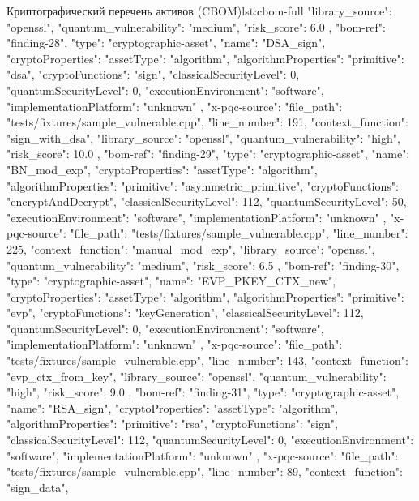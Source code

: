 \documentclass{itmo-vkr}
\begin{document}
\begin{itmolisting}[JSON]{Криптографический перечень активов (CBOM)}{lst:cbom-full}
{{{				"library_source": "openssl",
				"quantum_vulnerability": "medium",
				"risk_score": 6.0
			}
		},
		{
			"bom-ref": "finding-28",
			"type": "cryptographic-asset",
			"name": "DSA_sign",
			"cryptoProperties": {
				"assetType": "algorithm",
				"algorithmProperties": {
					"primitive": "dsa",
					"cryptoFunctions": "sign",
					"classicalSecurityLevel": 0,
					"quantumSecurityLevel": 0,
					"executionEnvironment": "software",
					"implementationPlatform": "unknown"
				}
			},
			"x-pqc-source": {
				"file_path": "tests/fixtures/sample_vulnerable.cpp",
				"line_number": 191,
				"context_function": "sign_with_dsa",
				"library_source": "openssl",
				"quantum_vulnerability": "high",
				"risk_score": 10.0
			}
		},
		{
			"bom-ref": "finding-29",
			"type": "cryptographic-asset",
			"name": "BN_mod_exp",
			"cryptoProperties": {
				"assetType": "algorithm",
				"algorithmProperties": {
					"primitive": "asymmetric_primitive",
					"cryptoFunctions": "encryptAndDecrypt",
					"classicalSecurityLevel": 112,
					"quantumSecurityLevel": 50,
					"executionEnvironment": "software",
					"implementationPlatform": "unknown"
				}
			},
			"x-pqc-source": {
				"file_path": "tests/fixtures/sample_vulnerable.cpp",
				"line_number": 225,
				"context_function": "manual_mod_exp",
				"library_source": "openssl",
				"quantum_vulnerability": "medium",
				"risk_score": 6.5
			}
		},
		{
			"bom-ref": "finding-30",
			"type": "cryptographic-asset",
			"name": "EVP_PKEY_CTX_new",
			"cryptoProperties": {
				"assetType": "algorithm",
				"algorithmProperties": {
					"primitive": "evp",
					"cryptoFunctions": "keyGeneration",
					"classicalSecurityLevel": 112,
					"quantumSecurityLevel": 0,
					"executionEnvironment": "software",
					"implementationPlatform": "unknown"
				}
			},
			"x-pqc-source": {
				"file_path": "tests/fixtures/sample_vulnerable.cpp",
				"line_number": 143,
				"context_function": "evp_ctx_from_key",
				"library_source": "openssl",
				"quantum_vulnerability": "high",
				"risk_score": 9.0
			}
		},
		{
			"bom-ref": "finding-31",
			"type": "cryptographic-asset",
			"name": "RSA_sign",
			"cryptoProperties": {
				"assetType": "algorithm",
				"algorithmProperties": {
					"primitive": "rsa",
					"cryptoFunctions": "sign",
					"classicalSecurityLevel": 112,
					"quantumSecurityLevel": 0,
					"executionEnvironment": "software",
					"implementationPlatform": "unknown"
				}
			},
			"x-pqc-source": {
				"file_path": "tests/fixtures/sample_vulnerable.cpp",
				"line_number": 89,
				"context_function": "sign_data",
}}}
\end{itmolisting}
\end{document}
